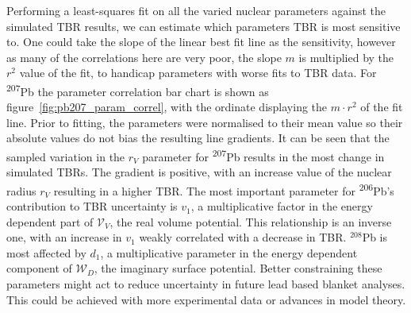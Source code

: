 Performing a least-squares fit on all the varied nuclear parameters against the simulated TBR results, we can estimate which parameters TBR is most sensitive to. One could take the slope of the linear best fit line as the sensitivity, however as many of the correlations here are very poor, the slope $m$ is multiplied by the $r^{2}$ value of the fit, to handicap parameters with worse fits to TBR data. For \textsuperscript{207}Pb the parameter correlation bar chart is shown as figure~\ref{fig:pb207_param_correl}, with the ordinate displaying the $m \cdot r^{2}$ of the fit line. Prior to fitting, the parameters were normalised to their mean value so their absolute values do not bias the resulting line gradients. It can be seen that the sampled variation in the $r_{V}$ parameter for \textsuperscript{207}Pb results in the most change in simulated TBRs. The gradient is positive, with an increase value of the nuclear radius $r_{V}$ resulting in a higher TBR. The most important parameter for \textsuperscript{206}Pb's contribution to TBR uncertainty is $v_{1}$, a multiplicative factor in the energy dependent part of $\mathcal{V}_{V}$, the real volume potential. This relationship is an inverse one, with an increase in $v_{1}$ weakly correlated with a decrease in TBR. $^{208}$Pb is most affected by $d_{1}$, a multiplicative parameter in the energy dependent component of $\mathcal{W}_{D}$, the imaginary surface potential. Better constraining these parameters might act to reduce uncertainty in future lead based blanket analyses. This could be achieved with more experimental data or advances in model theory.



